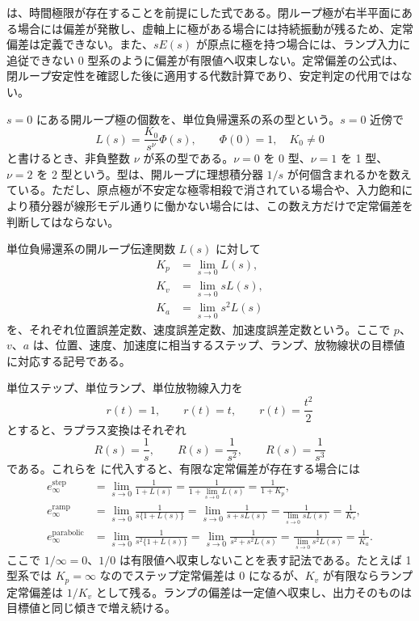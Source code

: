  は、時間極限が存在することを前提にした式である。閉ループ極が右半平面にある場合には偏差が発散し、虚軸上に極がある場合には持続振動が残るため、定常偏差は定義できない。また、$sE(s)$ が原点に極を持つ場合には、ランプ入力に追従できない 0 型系のように偏差が有限値へ収束しない。定常偏差の公式は、閉ループ安定性を確認した後に適用する代数計算であり、安定判定の代用ではない。

$s=0$ にある開ループ極の個数を、単位負帰還系の系の型という。$s=0$ 近傍で
\begin{equation}
  L(s)=\frac{K_0}{s^\nu}\Phi(s),
  \qquad
  \Phi(0)=1,\quad K_0\neq0
  \label{eq:loop-type-factor}
\end{equation}
と書けるとき、非負整数 $\nu$ が系の型である。$\nu=0$ を 0 型、$\nu=1$ を 1 型、$\nu=2$ を 2 型という。型は、開ループに理想積分器 $1/s$ が何個含まれるかを数えている。ただし、原点極が不安定な極零相殺で消されている場合や、入力飽和により積分器が線形モデル通りに働かない場合には、この数え方だけで定常偏差を判断してはならない。

\begin{definition}[位置・速度・加速度誤差定数]
単位負帰還系の開ループ伝達関数 $L(s)$ に対して
\begin{align}
  K_p&=\lim_{s\to0}L(s),\\
  K_v&=\lim_{s\to0}sL(s),\\
  K_a&=\lim_{s\to0}s^2L(s)
  \label{eq:error-constants}
\end{align}
を、それぞれ位置誤差定数、速度誤差定数、加速度誤差定数という。ここで $p$、$v$、$a$ は、位置、速度、加速度に相当するステップ、ランプ、放物線状の目標値に対応する記号である。
\end{definition}

単位ステップ、単位ランプ、単位放物線入力を
\begin{equation}
  r(t)=1,\qquad r(t)=t,\qquad r(t)=\frac{t^2}{2}
\end{equation}
とすると、ラプラス変換はそれぞれ
\begin{equation}
  R(s)=\frac{1}{s},\qquad
  R(s)=\frac{1}{s^2},\qquad
  R(s)=\frac{1}{s^3}
\end{equation}
である。これらを  に代入すると、有限な定常偏差が存在する場合には
\begin{align}
  e_\infty^{\mathrm{step}}
  &=
  \lim_{s\to0}\frac{1}{1+L(s)}
  =
  \frac{1}{1+\lim_{s\to0}L(s)}
  =
  \frac{1}{1+K_p},
  \label{eq:step-error-constant}\\
  e_\infty^{\mathrm{ramp}}
  &=
  \lim_{s\to0}\frac{1}{s\{1+L(s)\}}
  =
  \lim_{s\to0}\frac{1}{s+sL(s)}
  =
  \frac{1}{\lim_{s\to0}sL(s)}
  =
  \frac{1}{K_v},
  \label{eq:ramp-error-constant}\\
  e_\infty^{\mathrm{parabolic}}
  &=
  \lim_{s\to0}\frac{1}{s^2\{1+L(s)\}}
  =
  \lim_{s\to0}\frac{1}{s^2+s^2L(s)}
  =
  \frac{1}{\lim_{s\to0}s^2L(s)}
  =
  \frac{1}{K_a}.
  \label{eq:parabolic-error-constant}
\end{align}
ここで $1/\infty=0$、$1/0$ は有限値へ収束しないことを表す記法である。たとえば 1 型系では $K_p=\infty$ なのでステップ定常偏差は 0 になるが、$K_v$ が有限ならランプ定常偏差は $1/K_v$ として残る。ランプの偏差は一定値へ収束し、出力そのものは目標値と同じ傾きで増え続ける。

